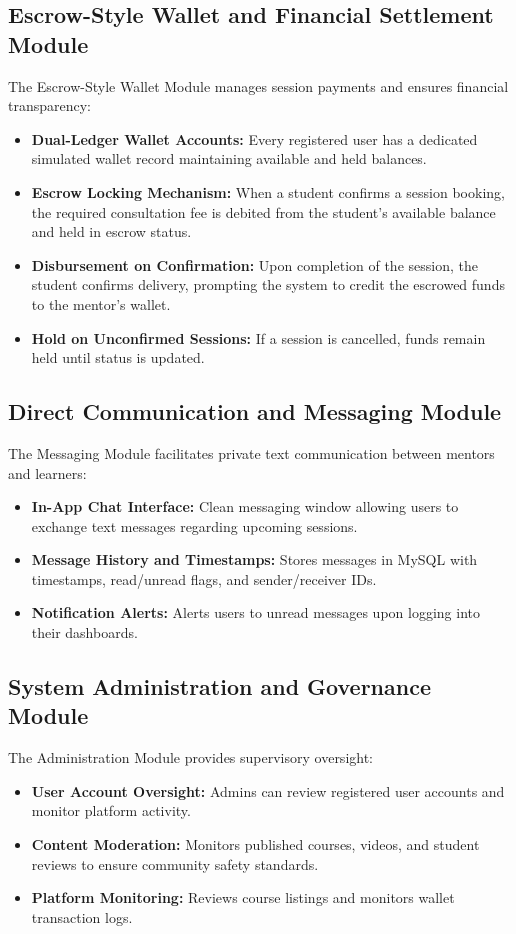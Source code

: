 \documentclass[12pt,a4paper]{report}
\begin{document}
\subsection{Escrow-Style Wallet and Financial Settlement Module}
The Escrow-Style Wallet Module manages session payments and ensures financial transparency:
\begin{itemize}[leftmargin=1.5em, itemsep=2pt]
  \item \textbf{Dual-Ledger Wallet Accounts:} Every registered user has a dedicated simulated wallet record maintaining available and held balances.
  \item \textbf{Escrow Locking Mechanism:} When a student confirms a session booking, the required consultation fee is debited from the student's available balance and held in escrow status.
  \item \textbf{Disbursement on Confirmation:} Upon completion of the session, the student confirms delivery, prompting the system to credit the escrowed funds to the mentor's wallet.
  \item \textbf{Hold on Unconfirmed Sessions:} If a session is cancelled, funds remain held until status is updated.
\end{itemize}

\subsection{Direct Communication and Messaging Module}
The Messaging Module facilitates private text communication between mentors and learners:
\begin{itemize}[leftmargin=1.5em, itemsep=2pt]
  \item \textbf{In-App Chat Interface:} Clean messaging window allowing users to exchange text messages regarding upcoming sessions.
  \item \textbf{Message History and Timestamps:} Stores messages in MySQL with timestamps, read/unread flags, and sender/receiver IDs.
  \item \textbf{Notification Alerts:} Alerts users to unread messages upon logging into their dashboards.
\end{itemize}

\subsection{System Administration and Governance Module}
The Administration Module provides supervisory oversight:
\begin{itemize}[leftmargin=1.5em, itemsep=2pt]
  \item \textbf{User Account Oversight:} Admins can review registered user accounts and monitor platform activity.
  \item \textbf{Content Moderation:} Monitors published courses, videos, and student reviews to ensure community safety standards.
  \item \textbf{Platform Monitoring:} Reviews course listings and monitors wallet transaction logs.
\end{itemize}
\end{document}
